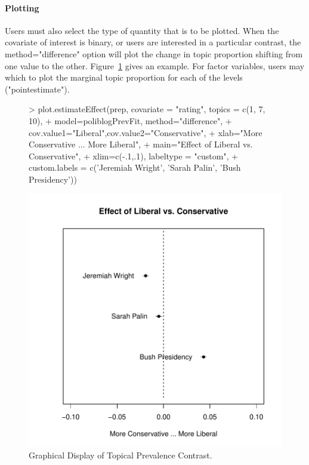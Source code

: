 \documentclass[nojss]{jss}
\begin{document}
\paragraph{Plotting}

Users must also select the type of quantity that is to be plotted. When the covariate of interest is binary, or users are interested in a particular contrast, the method="difference" option will plot the change in topic proportion shifting from one value to the other. Figure~\ref{fig:difference} gives an example. For factor variables, users may which to plot the marginal topic proportion for each of the levels ("pointestimate").


\begin{figure}[t!]
\begin{center}
\begin{Schunk}
\begin{Sinput}
> plot.estimateEffect(prep, covariate = "rating", topics = c(1, 7, 10),
+         model=poliblogPrevFit, method="difference",
+         cov.value1="Liberal",cov.value2="Conservative",
+         xlab="More Conservative ... More Liberal",
+         main="Effect of Liberal vs. Conservative",
+         xlim=c(-.1,.1), labeltype = "custom",
+         custom.labels = c('Jeremiah Wright', 'Sarah Palin', 'Bush Presidency'))
\end{Sinput}
\end{Schunk}
\includegraphics{stmVignette-013}
\caption{Graphical Display of Topical Prevalence Contrast.}
\label{fig:difference}
\end{center}
\end{figure}
\end{document}

